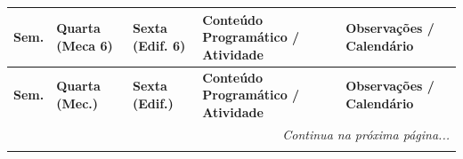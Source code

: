\documentclass[10pt,a4paper]{article}
\begin{document}
\small
\begin{longtable}{p{0.8cm} p{1.8cm} p{1.8cm} p{7.5cm} p{4.2cm}}

\toprule
\textbf{Sem.} & \textbf{Quarta (Meca 6)} & \textbf{Sexta (Edif. 6)} & \textbf{Conteúdo Programático / Atividade} & \textbf{Observações / Calendário} \\
\midrule
\endhead

\toprule
\textbf{Sem.} & \textbf{Quarta (Mec.)} & \textbf{Sexta (Edif.)} & \textbf{Conteúdo Programático / Atividade} & \textbf{Observações / Calendário} \\
\midrule
\endhead

\midrule
\multicolumn{5}{r}{\textit{Continua na próxima página...}} \\
\endfoot

\bottomrule
\endlastfoot


\end{longtable}
\end{document}
